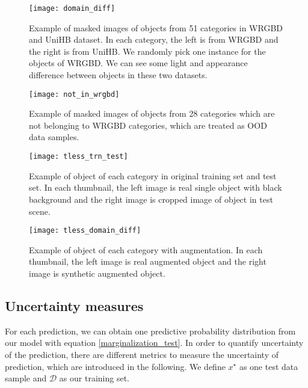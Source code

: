  \begin{figure}[H]
 	\begin{center}
 		\texttt{[image: domain\_diff]}
 		\caption{Example of masked images of objects from 51 categories in WRGBD and UniHB dataset. In each category, the left is from WRGBD and the right is from UniHB. We randomly pick one instance for the objects of WRGBD. We can see some light and appearance difference between objects in these two datasets.}		
 		\label{fig:wrgbd2}
 	\end{center}
 \end{figure}

\begin{figure}[H]
	\begin{center}
		\texttt{[image: not\_in\_wrgbd]}
		\caption{Example of masked images of objects from 28 categories which are not belonging to WRGBD categories, which are treated as OOD data samples.}		
		\label{fig:not_in_wrgbd}
	\end{center}
\end{figure} 

\begin{figure}[H]
	\begin{center}
		\texttt{[image: tless\_trn\_test]}
		\caption{Example of object of each category in original training set and test set. In each thumbnail, the left image is real single object with black background and the right image is cropped image of object in test scene.}		
		\label{fig:tless_test}
	\end{center}
\end{figure} 

\begin{figure}[H]
		\centering
		\texttt{[image: tless\_domain\_diff]}
		\caption{Example of object of each category with augmentation. In each thumbnail, the left image is real augmented object and the right image is synthetic augmented object.}		
		\label{fig:tless_train}
\end{figure} 


\subsection{Uncertainty measures}
For each prediction, we can obtain one predictive probability distribution from our model with equation \ref{marginalization_test}. In order to quantify uncertainty of the prediction, there are different metrics to measure the uncertainty of prediction, which are introduced in the following. We define $x^\star$ as one test data sample and $\mathcal D$ as our training set. 
